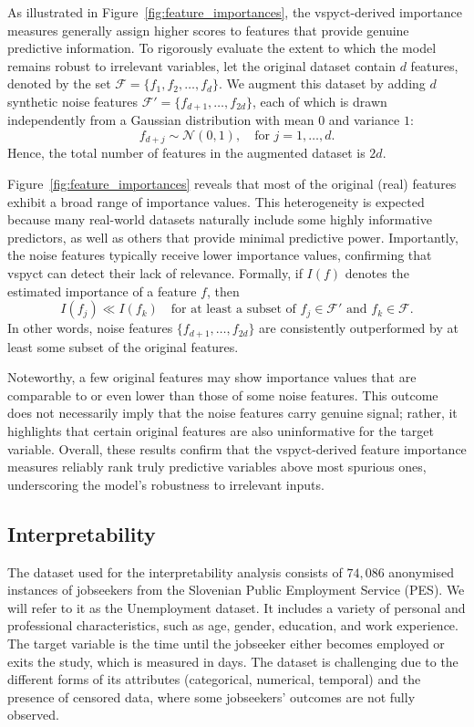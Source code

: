 \documentclass[3p,review,authoryear]{elsarticle}
\begin{document}
As illustrated in Figure~\ref{fig:feature_importances}, the \gls{vspyct}-derived importance measures generally assign higher scores to features that provide genuine predictive information.
To rigorously evaluate the extent to which the model remains robust to irrelevant variables, let the original dataset contain \(d\) features, denoted by the set
\(\mathcal{F} = \{f_1, f_2, \ldots, f_d\}\).
We augment this dataset by adding \(d\) synthetic noise features
\(\mathcal{F}' = \{f_{d+1}, \ldots, f_{2d}\}\),
each of which is drawn independently from a Gaussian distribution with mean \(0\) and variance \(1\):
\[
f_{d + j} \sim \mathcal{N}(0, 1), 
\quad \text{for } j = 1, \ldots, d.
\]
Hence, the total number of features in the augmented dataset is \(2d\).

Figure~\ref{fig:feature_importances} reveals that most of the original (real) features exhibit a broad range of importance values.
This heterogeneity is expected because many real-world datasets naturally include some highly informative predictors, as well as others that provide minimal predictive power.
Importantly, the noise features typically receive lower importance values, confirming that \gls{vspyct} can detect their lack of relevance.
Formally, if \(I(f)\) denotes the estimated importance of a feature \(f\), then
\[
I(f_j) \ll I(f_k)
\quad \text{for at least a subset of } f_j \in \mathcal{F}' \text{ and } f_k \in \mathcal{F}.
\]
In other words, noise features \(\{f_{d+1}, \ldots, f_{2d}\}\) are consistently outperformed by at least some subset of the original features.

Noteworthy, a few original features may show importance values that are comparable to or even lower than those of some noise features. 
This outcome does not necessarily imply that the noise features carry genuine signal; rather, it highlights that certain original features are also uninformative for the target variable.
Overall, these results confirm that the \gls{vspyct}-derived feature importance measures reliably rank truly predictive variables above most spurious ones, underscoring the model's robustness to irrelevant inputs.


\subsection{Interpretability}

The dataset used for the interpretability analysis consists of $74,086$ anonymised instances of jobseekers from the Slovenian Public Employment Service (PES).
We will refer to it as the Unemployment dataset.
It includes a variety of personal and professional characteristics, such as age, gender, education, and work experience.
The target variable is the time until the jobseeker either becomes employed or exits the study, which is measured in days.
The dataset is challenging due to the different forms of its attributes (categorical, numerical, temporal) and the presence of censored data, where some jobseekers’ outcomes are not fully observed.
\end{document}

